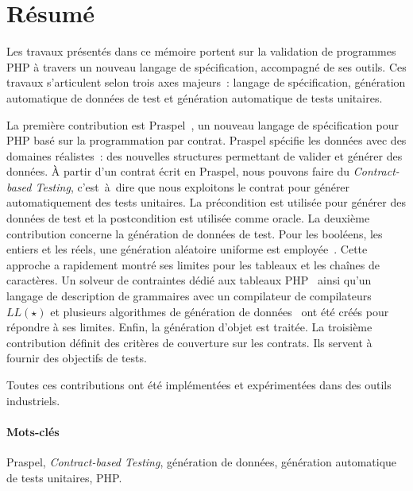 \documentclass[a4paper,11pt]{article}
\newcommand{\inenglish}[1]{\foreignlanguage{english}{\em #1}}
\newcommand{\acite}[1]{\citep{#1}}
\begin{document}
\section*{Résumé}

Les travaux présentés dans ce mémoire portent sur la validation de programmes
PHP à travers un nouveau langage de spécification, accompagné de ses outils. Ces
travaux s'articulent selon trois axes majeurs~: langage de spécification,
génération automatique de données de test et génération automatique de tests
unitaires.

La première contribution est Praspel~\acite{EnderlinDGO11}, un nouveau langage
de spécification pour PHP basé sur la programmation par contrat. Praspel
spécifie les données avec des domaines réalistes~: des nouvelles structures
permettant de valider et générer des données. À partir d'un contrat écrit en
Praspel, nous pouvons faire du \inenglish{Contract-based Testing}, c'est~à~dire
que nous exploitons le contrat pour générer automatiquement des tests unitaires.
La précondition est utilisée pour générer des données de test et la
postcondition est utilisée comme oracle. La deuxième contribution concerne la
génération de données de test. Pour les booléens, les entiers et les réels, une
génération aléatoire uniforme est employée~\acite{EnderlinDGO11}. Cette approche
a rapidement montré ses limites pour les tableaux et les chaînes de caractères.
Un solveur de contraintes dédié aux tableaux PHP~\acite{EnderlinGB13} ainsi
qu'un langage de description de grammaires avec un compilateur de compilateurs
$LL(\star)$ et plusieurs algorithmes de génération de
données~\acite{EnderlinDGB12} ont été créés pour répondre à ses limites. Enfin,
la génération d'objet est traitée. La troisième contribution définit des
critères de couverture sur les contrats. Ils servent à fournir des objectifs de
tests.

Toutes ces contributions ont été implémentées et expérimentées dans des outils
industriels.

\paragraph{Mots-clés} Praspel, \inenglish{Contract-based Testing}, géné\-ration
de données, géné\-ration automatique de tests unitaires, PHP.



\end{document}
